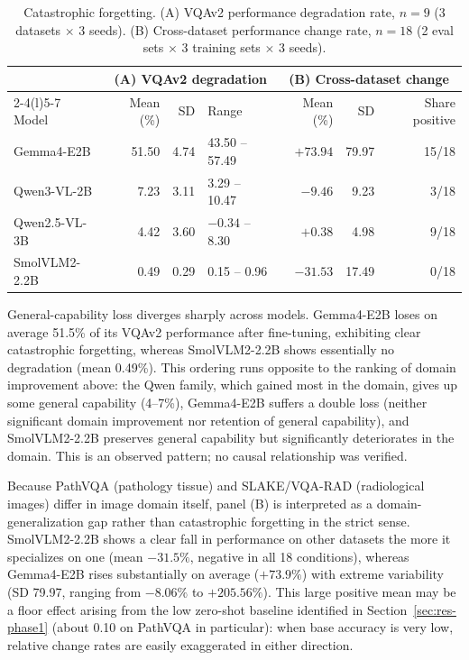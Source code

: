 \begin{table}[t]
\centering
\caption{Catastrophic forgetting. (A) VQAv2 performance degradation rate, $n = 9$
(3 datasets $\times$ 3 seeds). (B) Cross-dataset performance change rate,
$n = 18$ (2 eval sets $\times$ 3 training sets $\times$ 3 seeds).}
\label{tab:cf}
\small
\begin{tabular}{@{}lrrl@{\hspace{2em}}rrr@{}}
\toprule
& \multicolumn{3}{c}{(A) VQAv2 degradation} & \multicolumn{3}{c}{(B) Cross-dataset change} \\
\cmidrule(r){2-4}\cmidrule(l){5-7}
Model & Mean (\%) & SD & Range & Mean (\%) & SD & Share positive \\
\midrule
Gemma4-E2B    & 51.50 & 4.74 & 43.50 -- 57.49 & $+73.94$ & 79.97 & 15/18 \\
Qwen3-VL-2B   & 7.23  & 3.11 & 3.29 -- 10.47  & $-9.46$  & 9.23  & 3/18 \\
Qwen2.5-VL-3B & 4.42  & 3.60 & $-0.34$ -- 8.30 & $+0.38$ & 4.98  & 9/18 \\
SmolVLM2-2.2B & 0.49  & 0.29 & 0.15 -- 0.96   & $-31.53$ & 17.49 & 0/18 \\
\bottomrule
\end{tabular}
\end{table}

General-capability loss diverges sharply across models. Gemma4-E2B loses on
average 51.5\% of its VQAv2 performance after fine-tuning, exhibiting clear
catastrophic forgetting, whereas SmolVLM2-2.2B shows essentially no degradation
(mean 0.49\%). This ordering runs opposite to the ranking of domain improvement
above: the Qwen family, which gained most in the domain, gives up some general
capability (4--7\%), Gemma4-E2B suffers a double loss (neither significant domain
improvement nor retention of general capability), and SmolVLM2-2.2B preserves
general capability but significantly deteriorates in the domain. This is an
observed pattern; no causal relationship was verified.

Because PathVQA (pathology tissue) and SLAKE/VQA-RAD (radiological images) differ
in image domain itself, panel (B) is interpreted as a domain-generalization gap
rather than catastrophic forgetting in the strict sense. SmolVLM2-2.2B shows a
clear fall in performance on other datasets the more it specializes on one (mean
$-31.5\%$, negative in all 18 conditions), whereas Gemma4-E2B rises substantially
on average ($+73.9\%$) with extreme variability (SD 79.97, ranging from $-8.06\%$
to $+205.56\%$). This large positive mean may be a floor effect arising from the
low zero-shot baseline identified in Section~\ref{sec:res-phase1} (about 0.10 on
PathVQA in particular): when base accuracy is very low, relative change rates are
easily exaggerated in either direction.


